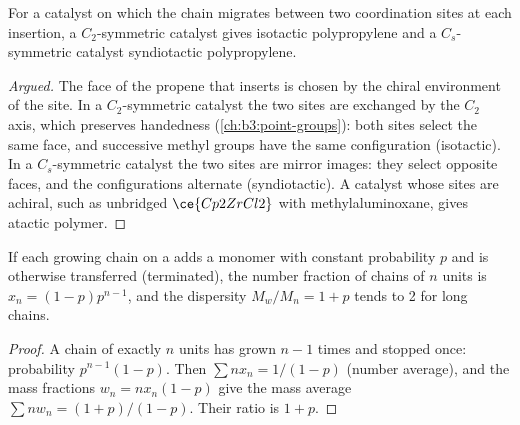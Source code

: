 \begin{proposition}\label{prop:b3:homogeneous-catalysis:tacticity-symmetry}
For a  catalyst on which the chain migrates between two coordination
sites at each insertion, a $C_2$-symmetric catalyst gives isotactic
polypropylene and a $C_s$-symmetric catalyst syndiotactic polypropylene.
\end{proposition}

\begin{proof}[Argued]
The face of the propene that inserts is chosen by the chiral environment of the
site. In a $C_2$-symmetric catalyst the two sites are exchanged by the $C_2$ axis,
which preserves handedness (\cref{ch:b3:point-groups}): both sites select the
same face, and successive methyl groups have the same configuration (isotactic).
In a $C_s$-symmetric catalyst the two sites are mirror images: they select opposite
faces, and the configurations alternate (syndiotactic). A catalyst whose sites
are achiral, such as unbridged $\ce{Cp2ZrCl2}$ with methylaluminoxane, gives atactic
polymer.
\end{proof}

\begin{proposition}\label{prop:b3:homogeneous-catalysis:schulz-flory}
If each growing chain on a  adds a monomer with constant
probability $p$ and is otherwise transferred (terminated), the number fraction of
chains of $n$ units is $x_n = (1 - p)p^{n-1}$, and the dispersity $M_w/M_n = 1 + p$ tends to 2 for long chains.
\end{proposition}

\begin{proof}
A chain of exactly $n$ units has grown $n - 1$ times and stopped once:
probability $p^{n-1}(1 - p)$. Then $\sum nx_n = 1/(1 - p)$ (number average), and the mass
fractions $w_n = nx_n(1 - p)$ give the mass average $\sum nw_n = (1 + p)/(1 - p)$. Their
ratio is $1 + p$.
\end{proof}

